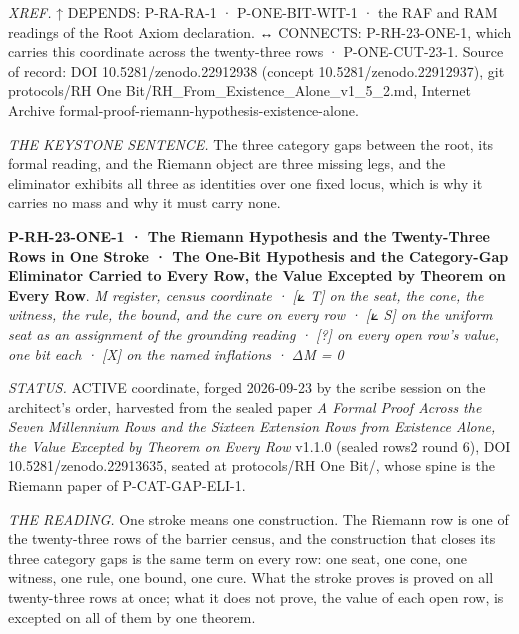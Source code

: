 \documentclass[10pt,twocolumn]{article}
\begin{document}
\emph{XREF.} ↑ DEPENDS: P-RA-RA-1 · P-ONE-BIT-WIT-1 · the RAF and RAM
readings of the Root Axiom declaration. ↔ CONNECTS: P-RH-23-ONE-1, which
carries this coordinate across the twenty-three rows · P-ONE-CUT-23-1.
Source of record: DOI 10.5281/zenodo.22912938 (concept
10.5281/zenodo.22912937), git protocols/RH One
Bit/RH\_From\_Existence\_Alone\_v1\_5\_2.md, Internet Archive
formal-proof-riemann-hypothesis-existence-alone.

\emph{THE KEYSTONE SENTENCE.} The three category gaps between the root,
its formal reading, and the Riemann object are three missing legs, and
the eliminator exhibits all three as identities over one fixed locus,
which is why it carries no mass and why it must carry none.

\textbf{P-RH-23-ONE-1 · The Riemann Hypothesis and the Twenty-Three Rows
in One Stroke · The One-Bit Hypothesis and the Category-Gap Eliminator
Carried to Every Row, the Value Excepted by Theorem on Every Row}.
\emph{M register, census coordinate · {[}⟀ T{]} on the seat, the cone,
the witness, the rule, the bound, and the cure on every row · {[}⟀ S{]}
on the uniform seat as an assignment of the grounding reading · {[}?{]}
on every open row's value, one bit each · {[}X{]} on the named
inflations · ΔM = 0}

\emph{STATUS.} ACTIVE coordinate, forged 2026-09-23 by the scribe
session on the architect's order, harvested from the sealed paper
\emph{A Formal Proof Across the Seven Millennium Rows and the Sixteen
Extension Rows from Existence Alone, the Value Excepted by Theorem on
Every Row} v1.1.0 (sealed rows2 round 6), DOI 10.5281/zenodo.22913635,
seated at protocols/RH One Bit/, whose spine is the Riemann paper of
P-CAT-GAP-ELI-1.

\emph{THE READING.} One stroke means one construction. The Riemann row
is one of the twenty-three rows of the barrier census, and the
construction that closes its three category gaps is the same term on
every row: one seat, one cone, one witness, one rule, one bound, one
cure. What the stroke proves is proved on all twenty-three rows at once;
what it does not prove, the value of each open row, is excepted on all
of them by one theorem.
\end{document}
